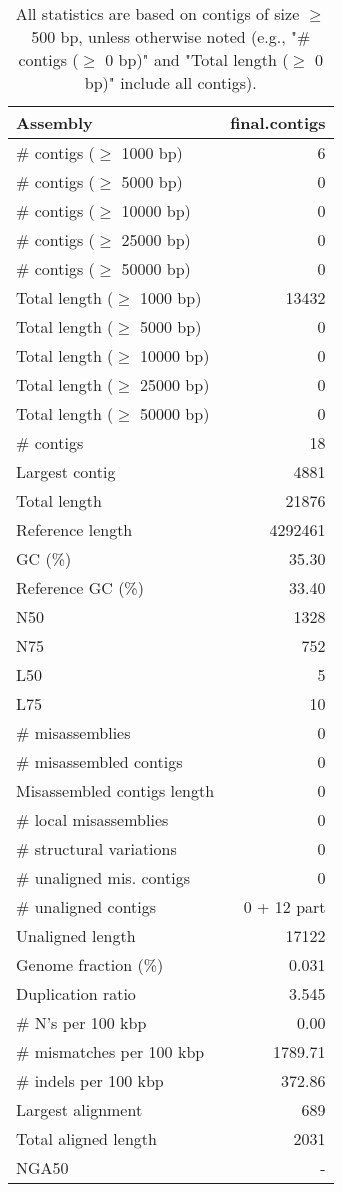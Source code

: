 \documentclass[12pt,a4paper]{article}
\begin{document}
\begin{table}[ht]
\begin{center}
\caption{All statistics are based on contigs of size $\geq$ 500 bp, unless otherwise noted (e.g., "\# contigs ($\geq$ 0 bp)" and "Total length ($\geq$ 0 bp)" include all contigs).}
\begin{tabular}{|l*{1}{|r}|}
\hline
Assembly & final.contigs \\ \hline
\# contigs ($\geq$ 1000 bp) & 6 \\ \hline
\# contigs ($\geq$ 5000 bp) & 0 \\ \hline
\# contigs ($\geq$ 10000 bp) & 0 \\ \hline
\# contigs ($\geq$ 25000 bp) & 0 \\ \hline
\# contigs ($\geq$ 50000 bp) & 0 \\ \hline
Total length ($\geq$ 1000 bp) & 13432 \\ \hline
Total length ($\geq$ 5000 bp) & 0 \\ \hline
Total length ($\geq$ 10000 bp) & 0 \\ \hline
Total length ($\geq$ 25000 bp) & 0 \\ \hline
Total length ($\geq$ 50000 bp) & 0 \\ \hline
\# contigs & 18 \\ \hline
Largest contig & 4881 \\ \hline
Total length & 21876 \\ \hline
Reference length & 4292461 \\ \hline
GC (\%) & 35.30 \\ \hline
Reference GC (\%) & 33.40 \\ \hline
N50 & 1328 \\ \hline
N75 & 752 \\ \hline
L50 & 5 \\ \hline
L75 & 10 \\ \hline
\# misassemblies & 0 \\ \hline
\# misassembled contigs & 0 \\ \hline
Misassembled contigs length & 0 \\ \hline
\# local misassemblies & 0 \\ \hline
\# structural variations & 0 \\ \hline
\# unaligned mis. contigs & 0 \\ \hline
\# unaligned contigs & 0 + 12 part \\ \hline
Unaligned length & 17122 \\ \hline
Genome fraction (\%) & 0.031 \\ \hline
Duplication ratio & 3.545 \\ \hline
\# N's per 100 kbp & 0.00 \\ \hline
\# mismatches per 100 kbp & 1789.71 \\ \hline
\# indels per 100 kbp & 372.86 \\ \hline
Largest alignment & 689 \\ \hline
Total aligned length & 2031 \\ \hline
NGA50 & - \\ \hline
\end{tabular}
\end{center}
\end{table}
\end{document}
